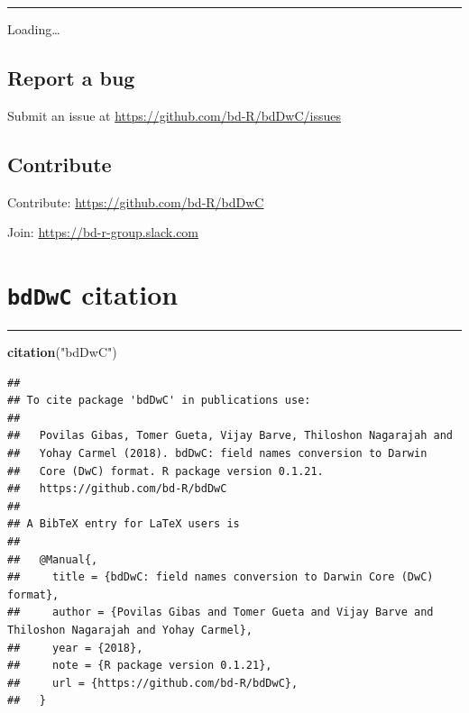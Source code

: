 \documentclass[]{book}
\newenvironment{Shaded}{\begin{snugshade}}{\end{snugshade}}
\newcommand{\KeywordTok}[1]{\textcolor[rgb]{0.13,0.29,0.53}{\textbf{#1}}}
\newcommand{\StringTok}[1]{\textcolor[rgb]{0.31,0.60,0.02}{#1}}
\newcommand{\NormalTok}[1]{#1}
\theoremstyle{definition}
\theoremstyle{definition}
\theoremstyle{definition}
\theoremstyle{remark}
\begin{document}
\begin{center}\rule{0.5\linewidth}{\linethickness}\end{center}

Loading\ldots{}

\section{Report a bug}\label{report-a-bug}

Submit an issue at \url{https://github.com/bd-R/bdDwC/issues}

\section{Contribute}\label{contribute}

Contribute: \url{https://github.com/bd-R/bdDwC}

Join: \url{https://bd-r-group.slack.com}

\chapter{\texorpdfstring{\texttt{bdDwC}
citation}{bdDwC citation}}\label{bddwc-citation}

\begin{center}\rule{0.5\linewidth}{\linethickness}\end{center}

\begin{Shaded}
\begin{Highlighting}[]
\KeywordTok{citation}\NormalTok{(}\StringTok{"bdDwC"}\NormalTok{)}
\end{Highlighting}
\end{Shaded}

\begin{verbatim}
## 
## To cite package 'bdDwC' in publications use:
## 
##   Povilas Gibas, Tomer Gueta, Vijay Barve, Thiloshon Nagarajah and
##   Yohay Carmel (2018). bdDwC: field names conversion to Darwin
##   Core (DwC) format. R package version 0.1.21.
##   https://github.com/bd-R/bdDwC
## 
## A BibTeX entry for LaTeX users is
## 
##   @Manual{,
##     title = {bdDwC: field names conversion to Darwin Core (DwC) format},
##     author = {Povilas Gibas and Tomer Gueta and Vijay Barve and Thiloshon Nagarajah and Yohay Carmel},
##     year = {2018},
##     note = {R package version 0.1.21},
##     url = {https://github.com/bd-R/bdDwC},
##   }
\end{verbatim}
\end{document}
